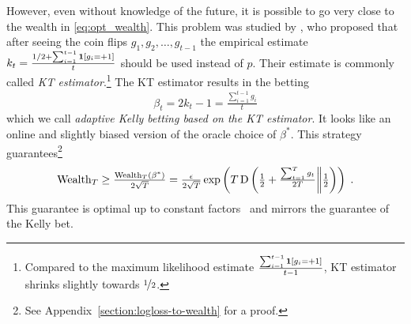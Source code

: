 However, even without knowledge of the future, it is possible to go very close
to the wealth in \eqref{eq:opt_wealth}.  This problem was studied by
\citet{Krichevsky-Trofimov-1981}, who proposed that after seeing the coin flips
$g_1, g_2, \dots, g_{t-1}$ the empirical estimate $k_t = \frac{1/2 +
\sum_{i=1}^{t-1} \mathbf{1}[g_i = +1]}{t}$ should be used instead of $p$. Their
estimate is commonly called \emph{KT estimator}.\footnote{Compared to the
maximum likelihood estimate $\frac{\sum_{i=1}^{t-1} \mathbf{1}[g_i =
+1]}{t-1}$, KT estimator shrinks slightly towards $\nicefrac{1}{2}$.} The KT
estimator results in the betting
\begin{equation}
\label{equation:kt-estimator-betting-strategy}
\beta_t = 2k_t - 1 = \tfrac{\sum_{i=1}^{t-1} g_i}{t}
\end{equation}
which we call \emph{adaptive Kelly betting based on the KT estimator}. It looks
like an online and slightly biased version of the oracle choice of $\beta^*$.
This strategy guarantees\footnote{See Appendix~\ref{section:logloss-to-wealth}
for a proof.}
\[
\operatorname{Wealth}_T \ge \tfrac{\operatorname{Wealth}_T(\beta^*)}{2\sqrt{T}}
= \tfrac{\epsilon}{2\sqrt{T}} \exp\left(T \operatorname{D}\left({\tfrac{1}{2}+\tfrac{\sum_{t=1}^T g_t}{2T}}\middle\|{\tfrac{1}{2}}\right)\right)\; .
\]
This guarantee is optimal up to constant
factors~\citep{Cesa-Bianchi-Lugosi-2006} and mirrors the guarantee of the Kelly
bet.


